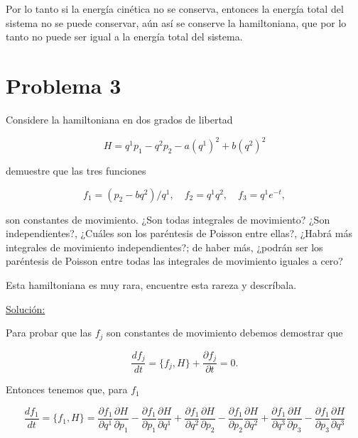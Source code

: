 \documentclass[a4paper,10pt]{article}
\numberwithin{equation}{section}
\begin{document}
Por lo tanto si la energía cinética no se conserva, entonces la energía total del sistema
no se puede conservar, aún así se conserve la hamiltoniana, que por lo tanto no puede 
ser igual a la energía total del sistema.

\section{Problema 3}

Considere la hamiltoniana en dos grados de libertad 

$$
H = q^1p_1 - q^2p_2 - a(q^1)^2 + b(q^2)^2
$$

demuestre que las tres funciones 

$$
f_1 = (p_2 - bq^2)/q^1, \quad f_2 = q^1q^2, \quad f_3=q^1e^{-t},
$$

son constantes de movimiento. ¿Son todas integrales de movimiento? ¿Son independientes?, 
¿Cuáles son los paréntesis de Poisson entre ellas?, ¿Habrá más integrales de movimiento 
independientes?; de haber más, ¿podrán ser los paréntesis de Poisson entre todas 
las integrales de movimiento iguales a cero?

\vspace{.3cm}

Esta hamiltoniana es muy rara, encuentre esta rareza y descríbala.

\vspace{.3cm}

\underline{Solución:} \vspace{.3cm}

Para probar que las $f_j$ son constantes de movimiento debemos demostrar que 

\begin{equation}
 \frac{df_j}{dt} = \{f_j,H\} + \frac{\partial f_j}{\partial t} =  0.
\end{equation}

Entonces tenemos que, para $f_1$

\begin{equation}
 \frac{df_1}{dt} = \{f_1,H\} = \frac{\partial f_1}{\partial q^1}\frac{\partial H}{\partial p_1} - 
 \frac{\partial f_1}{\partial p_1}\frac{\partial H}{\partial q^1} +  \frac{\partial f_1}{\partial q^2}\frac{\partial H}{\partial p_2} - 
 \frac{\partial f_1}{\partial p_2}\frac{\partial H}{\partial q^2} +  \frac{\partial f_1}{\partial q^3}\frac{\partial H}{\partial p_3} - 
 \frac{\partial f_1}{\partial p_3}\frac{\partial H}{\partial q^3}
\end{equation}
\end{document}

